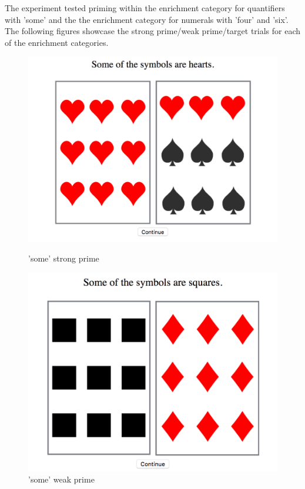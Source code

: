 \documentclass[]{article}
\begin{document}
The experiment tested priming within the enrichment category for quantifiers with 'some' and the the enrichment category for numerals with 'four' and 'six'.\\
The following figures showcase the strong prime/weak prime/target trials for each of the enrichment categories.\\
\begin{figure}[h]
\centering
\begin{minipage}[b]{0.3\textwidth}
\includegraphics[width=\textwidth]{some_strong.png} 
\caption{'some' strong prime}
\end{minipage}
\begin{minipage}[b]{0.3\textwidth}

\includegraphics[width=\textwidth]{some_weak.png} 
\caption{'some' weak prime}
\end{minipage}
\begin{minipage}[b]{0.3\textwidth}


\end{minipage}
\end{figure}
\end{document}
